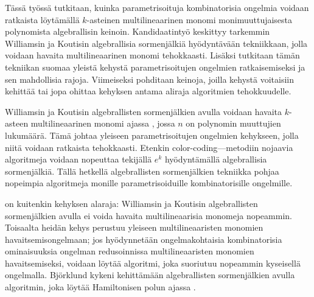 %
%

\begin{fiabstract}
  Tässä työssä tutkitaan, kuinka parametrisoituja kombinatorisia ongelmia voidaan 
  ratkaista löytämällä $k$-asteinen multilineaarinen monomi monimuuttujaisesta 
  polynomista algebrallisin keinoin. Kandidaatintyö keskittyy tarkemmin 
  Williamsin ja Koutisin algebrallisia sormenjälkiä hyödyntävään 
  tekniikkaan, jolla voidaan havaita multilineaarinen monomi tehokkaasti. 
  Lisäksi tutkitaan tämän tekniikan suomaa yleistä kehystä parametrisoitujen 
  ongelmien ratkaisemiseksi ja sen mahdollisia rajoja. 
  Viimeiseksi pohditaan keinoja, joilla kehystä voitaisiin kehittää tai jopa 
  ohittaa kehyksen 
  antama aliraja algoritmien tehokkuudelle. 

  Williamsin ja Koutisin algebrallisten sormenjälkien avulla voidaan 
  havaita $k$-asteen multilineaarinen monomi ajassa , 
  jossa $n$ on polynomin muuttujien lukumäärä. Tämä johtaa yleiseen 
  parametrisoitujen ongelmien kehykseen, jolla niitä voidaan ratkaista 
  tehokkaasti. 
  Etenkin color-coding—metodiin 
  nojaavia algoritmeja voidaan nopeuttaa tekijällä $e^k$ hyödyntämällä 
  algebrallisia sormenjälkiä. Tällä hetkellä algebrallisten sormenjälkien 
  tekniikka pohjaa nopeimpia algoritmeja monille parametrisoiduille 
  kombinatorisille ongelmille.

   on kuitenkin 
  kehyksen alaraja: Williamsin ja Koutisin algebrallisten sormenjälkien 
  avulla ei voida havaita multilineaarisia monomeja nopeammin. Toisaalta 
  heidän kehys perustuu yleiseen multilineaaristen monomien havaitsemisongelmaan; 
  jos hyödynnetään ongelmakohtaisia kombinatorisia ominaisuuksia ongelman 
  redusoinnissa multilineaaristen monomien havaitsemiseksi, 
  voidaan löytää algoritmi, joka suoriutuu nopeammin kyseisellä ongelmalla. Björklund kykeni 
  kehittämään algebrallisten sormenjälkien avulla algoritmin, joka 
  löytää Hamiltonisen polun ajassa .
%

\end{fiabstract}
